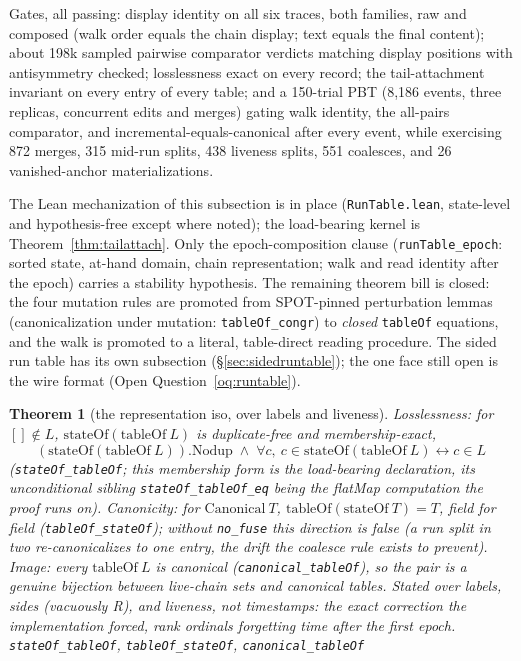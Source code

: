 \documentclass[11pt]{article}
\newtheorem{theorem}{Theorem}[section]
\newcommand{\lean}[1]{\texttt{#1}}
\newcommand{\code}[1]{\texttt{#1}}
\begin{document}
Gates, all passing: display identity on all six traces, both families,
raw and composed (walk order equals the chain display; text equals the
final content); about 198k sampled pairwise comparator verdicts
matching display positions with antisymmetry checked; losslessness
exact on every record; the tail-attachment invariant on every entry of
every table; and a 150-trial PBT (8{,}186 events, three replicas,
concurrent edits and merges) gating walk identity, the all-pairs
comparator, and incremental-equals-canonical after every event, while
exercising 872 merges, 315 mid-run splits, 438 liveness splits, 551
coalesces, and 26 vanished-anchor materializations.

The Lean mechanization of this subsection is in place
(\code{RunTable.lean}, state-level and
hypothesis-free except where noted); the load-bearing kernel is
Theorem~\ref{thm:tailattach}. Only the epoch-composition clause
(\lean{runTable\_epoch}: sorted state, at-hand domain, chain
representation; walk and read identity after the epoch) carries a
stability hypothesis. The remaining theorem bill is closed: the four
mutation rules are promoted from SPOT-pinned
perturbation lemmas (canonicalization under mutation:
\lean{tableOf\_congr}) to \emph{closed} \lean{tableOf} equations, and
the walk is promoted to a literal, table-direct reading procedure. The
sided run table has its own subsection (\S\ref{sec:sidedruntable});
the one face still open is the wire format (Open
Question~\ref{oq:runtable}).

\begin{theorem}[the representation iso, over labels and liveness]
\label{thm:runiso}
Losslessness: for $[] \notin L$, $\mathrm{stateOf}(\mathrm{tableOf}\
L)$ is duplicate-free and membership-exact,
\[
  (\mathrm{stateOf}(\mathrm{tableOf}\ L)).\mathrm{Nodup}
  \;\wedge\; \forall c,\ c \in \mathrm{stateOf}(\mathrm{tableOf}\ L)
  \leftrightarrow c \in L
\]
(\lean{stateOf\_tableOf}; this membership form is the load-bearing
declaration, its unconditional sibling \lean{stateOf\_tableOf\_eq}
being the flatMap computation the proof runs on). Canonicity: for
$\mathrm{Canonical}\ T$, $\mathrm{tableOf}(\mathrm{stateOf}\ T) = T$,
field for field (\lean{tableOf\_stateOf}); without \code{no\_fuse}
this direction is false (a run split in two re-canonicalizes to one
entry, the drift the coalesce rule exists to prevent). Image: every
$\mathrm{tableOf}\ L$ is canonical (\lean{canonical\_tableOf}), so the
pair is a genuine bijection between live-chain sets and canonical
tables. Stated over labels, sides (vacuously R), and liveness,
\emph{not} timestamps: the exact correction the implementation forced,
rank ordinals forgetting time after the first epoch.
\hfill\lean{stateOf\_tableOf}, \lean{tableOf\_stateOf},
\lean{canonical\_tableOf}
\end{theorem}
\end{document}
